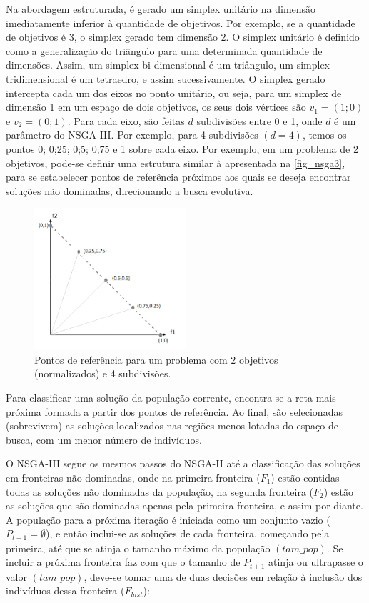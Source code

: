Na abordagem estruturada, é gerado um simplex unitário na dimensão imediatamente inferior à quantidade de objetivos. Por exemplo, se a quantidade de objetivos é 3, o simplex gerado tem dimensão 2. O simplex unitário é definido como a generalização do triângulo para uma determinada quantidade de dimensões. Assim, um simplex bi-dimensional é um triângulo, um simplex tridimensional é um tetraedro, e assim sucessivamente. O simplex gerado intercepta cada um dos eixos no ponto unitário, ou seja, para um simplex de dimensão 1 em um espaço de dois objetivos, os seus dois vértices são $v_1 = (1;0)$ e $v_2 = (0;1)$. Para cada eixo, são feitas $d$ subdivisões entre 0 e 1, onde $d$ é um parâmetro do NSGA-III.  Por exemplo, para 4 subdivisões $(d = 4)$, temos os pontos 0; 0;25; 0;5; 0;75 e 1 sobre cada eixo. Por exemplo, em um problema de 2 objetivos, pode-se definir uma estrutura similar à apresentada na \autoref{fig_nsga3}, para se estabelecer pontos de referência próximos aos quais se deseja encontrar soluções não dominadas, direcionando a busca evolutiva.

\begin{figure}[!htbp]
	\centering
	\includegraphics[width=0.5\textwidth]{cap_otimizacao-multi/figs/nsga3}
	\caption{\label{fig_nsga3}Pontos de referência para um problema com 2 objetivos (normalizados) e 4 subdivisões.}
\end{figure}

Para classificar uma solução da população corrente, encontra-se a reta mais próxima formada a partir dos pontos de referência. Ao final, são selecionadas (sobrevivem) as soluções localizados nas regiões menos lotadas do espaço de busca, com um menor número de indivíduos.

O NSGA-III segue os mesmos passos do NSGA-II até a classificação das soluções em fronteiras não dominadas, onde na primeira fronteira ($F_1$) estão contidas todas as soluções não dominadas da população, na segunda fronteira ($F_2$) estão as soluções que são dominadas apenas pela primeira fronteira, e assim por diante. A população para a próxima iteração é iniciada como um conjunto vazio ($P_{t+1} = \emptyset$), e então inclui-se as soluções de cada fronteira, começando pela primeira, até que se atinja o tamanho máximo da população $(tam\_pop)$. Se incluir a próxima fronteira faz com que o tamanho de $P_{t+1}$ atinja ou ultrapasse o valor $(tam\_pop)$, deve-se tomar uma de duas decisões em relação à inclusão dos indivíduos dessa fronteira ($F_{last}$):

